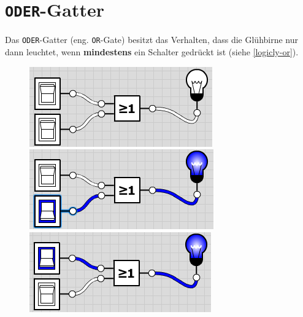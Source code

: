 \section{\texttt{ODER}-Gatter}

Das \texttt{ODER}-Gatter (eng. \texttt{OR}-Gate) besitzt das Verhalten, dass die Glühbirne nur dann leuchtet, wenn \textbf{mindestens} ein Schalter gedrückt ist (siehe \autoref{logicly-or}).

\begin{figure}[htb]
\centering
\begin{minipage}{0.225\textwidth}
\includegraphics[width=\textwidth]{./or/or_off_off}
\end{minipage}
\begin{minipage}{0.225\textwidth}
\includegraphics[width=\textwidth]{./or/or_off_on}
\end{minipage}
\begin{minipage}{0.225\textwidth}
\includegraphics[width=\textwidth]{./or/or_on_off}

\end{minipage}
\end{figure}

